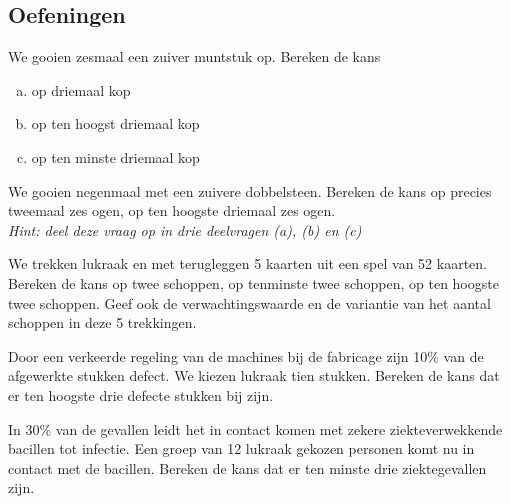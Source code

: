 \documentclass[a4paper,12pt, twoside]{article}
\begin{document}
\pagebreak
\subsection{Oefeningen}

\begin{oefening}
We gooien zesmaal een zuiver muntstuk op. Bereken de kans
\begin{enumerate}[(a)]
  \item op driemaal kop
  \item op ten hoogst driemaal kop
  \item op ten minste driemaal kop
\end{enumerate}
\end{oefening}

\begin{oefening}
We gooien negenmaal met een zuivere dobbelsteen. Bereken de kans op precies tweemaal zes ogen, op ten hoogste driemaal zes ogen.\\
{\em Hint: deel deze vraag op in drie deelvragen (a), (b) en (c)}
\end{oefening}

\begin{oefening}
We trekken lukraak en met terugleggen 5 kaarten uit een spel van 52 kaarten. Bereken de kans op twee schoppen, op tenminste twee schoppen, op ten hoogste twee schoppen. Geef ook de verwachtingswaarde en de variantie van het aantal schoppen in deze 5 trekkingen.
\end{oefening}

\begin{oefening}
Door een verkeerde regeling van de machines bij de fabricage zijn 10\% van de afgewerkte stukken defect. We kiezen lukraak tien stukken. Bereken de kans dat er ten hoogste drie defecte stukken bij zijn.
\end{oefening}

\begin{oefening}
In 30\% van de gevallen leidt het in contact komen met zekere ziekteverwekkende bacillen tot infectie. Een groep van 12 lukraak gekozen personen komt nu in contact met de bacillen. Bereken de kans dat er ten minste drie ziektegevallen zijn.
\end{oefening}

\end{document}
